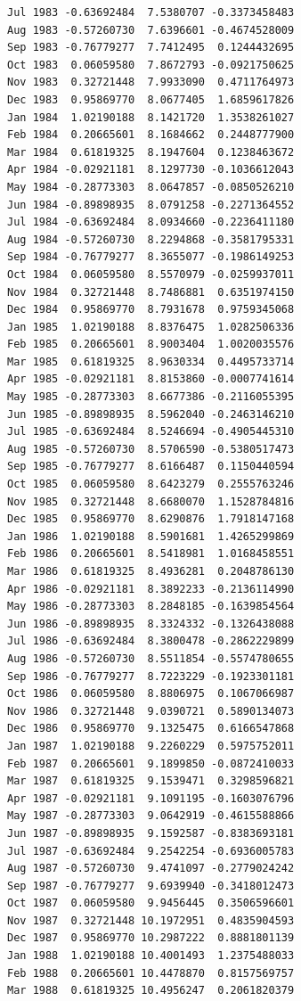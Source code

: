 \documentclass[
  11pt,
  a4paper,
]{report}
\begin{document}
\begin{verbatim}
Jul 1983 -0.63692484  7.5380707 -0.3373458483
Aug 1983 -0.57260730  7.6396601 -0.4674528009
Sep 1983 -0.76779277  7.7412495  0.1244432695
Oct 1983  0.06059580  7.8672793 -0.0921750625
Nov 1983  0.32721448  7.9933090  0.4711764973
Dec 1983  0.95869770  8.0677405  1.6859617826
Jan 1984  1.02190188  8.1421720  1.3538261027
Feb 1984  0.20665601  8.1684662  0.2448777900
Mar 1984  0.61819325  8.1947604  0.1238463672
Apr 1984 -0.02921181  8.1297730 -0.1036612043
May 1984 -0.28773303  8.0647857 -0.0850526210
Jun 1984 -0.89898935  8.0791258 -0.2271364552
Jul 1984 -0.63692484  8.0934660 -0.2236411180
Aug 1984 -0.57260730  8.2294868 -0.3581795331
Sep 1984 -0.76779277  8.3655077 -0.1986149253
Oct 1984  0.06059580  8.5570979 -0.0259937011
Nov 1984  0.32721448  8.7486881  0.6351974150
Dec 1984  0.95869770  8.7931678  0.9759345068
Jan 1985  1.02190188  8.8376475  1.0282506336
Feb 1985  0.20665601  8.9003404  1.0020035576
Mar 1985  0.61819325  8.9630334  0.4495733714
Apr 1985 -0.02921181  8.8153860 -0.0007741614
May 1985 -0.28773303  8.6677386 -0.2116055395
Jun 1985 -0.89898935  8.5962040 -0.2463146210
Jul 1985 -0.63692484  8.5246694 -0.4905445310
Aug 1985 -0.57260730  8.5706590 -0.5380517473
Sep 1985 -0.76779277  8.6166487  0.1150440594
Oct 1985  0.06059580  8.6423279  0.2555763246
Nov 1985  0.32721448  8.6680070  1.1528784816
Dec 1985  0.95869770  8.6290876  1.7918147168
Jan 1986  1.02190188  8.5901681  1.4265299869
Feb 1986  0.20665601  8.5418981  1.0168458551
Mar 1986  0.61819325  8.4936281  0.2048786130
Apr 1986 -0.02921181  8.3892233 -0.2136114990
May 1986 -0.28773303  8.2848185 -0.1639854564
Jun 1986 -0.89898935  8.3324332 -0.1326438088
Jul 1986 -0.63692484  8.3800478 -0.2862229899
Aug 1986 -0.57260730  8.5511854 -0.5574780655
Sep 1986 -0.76779277  8.7223229 -0.1923301181
Oct 1986  0.06059580  8.8806975  0.1067066987
Nov 1986  0.32721448  9.0390721  0.5890134073
Dec 1986  0.95869770  9.1325475  0.6166547868
Jan 1987  1.02190188  9.2260229  0.5975752011
Feb 1987  0.20665601  9.1899850 -0.0872410033
Mar 1987  0.61819325  9.1539471  0.3298596821
Apr 1987 -0.02921181  9.1091195 -0.1603076796
May 1987 -0.28773303  9.0642919 -0.4615588866
Jun 1987 -0.89898935  9.1592587 -0.8383693181
Jul 1987 -0.63692484  9.2542254 -0.6936005783
Aug 1987 -0.57260730  9.4741097 -0.2779024242
Sep 1987 -0.76779277  9.6939940 -0.3418012473
Oct 1987  0.06059580  9.9456445  0.3506596601
Nov 1987  0.32721448 10.1972951  0.4835904593
Dec 1987  0.95869770 10.2987222  0.8881801139
Jan 1988  1.02190188 10.4001493  1.2375488033
Feb 1988  0.20665601 10.4478870  0.8157569757
Mar 1988  0.61819325 10.4956247  0.2061820379

\end{verbatim}
\end{document}
